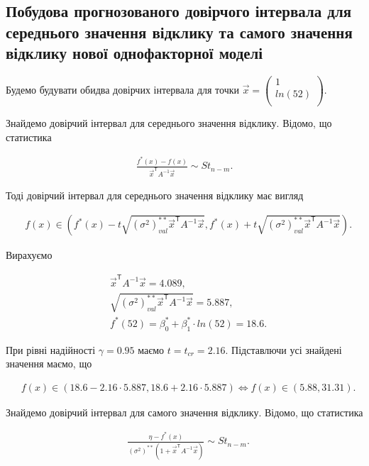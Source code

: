 \documentclass[14pt,a4paper]{scrartcl}
\theoremstyle{definition}
\theoremstyle{remark}
\theoremstyle{definition}
\theoremstyle{definition}
\begin{document}
\subsection{Побудова прогнозованого довірчого інтервала для середнього значення відклику та самого значення відклику нової однофакторної моделі}

Будемо будувати обидва довірчих інтервала для точки $\vec{x} = \begin{pmatrix}
  1 \\
  ln(52) \\
\end{pmatrix}$.

Знайдемо довірчий інтервал для середнього значення відклику. Відомо, що статистика

\begin{align*}
  \frac{f^{*}(x) - f(x)}{\vec{x}^\mathsf{T}A^{-1}\vec{x}} \sim St_{n - m}.
\end{align*}

Тоді довірчий інтервал для середнього значення відклику має вигляд

\begin{align*}
  & f(x) \in \left( f^{*}(x) - t \sqrt{(\sigma^2)^{**}_{val}  \vec{x}^\mathsf{T} A^{-1} \vec{x}}, f^{*}(x) + t \sqrt{(\sigma^2)^{**}_{val} \vec{x}^\mathsf{T} A^{-1} \vec{x}}  \right).
\end{align*}

Вирахуємо

\begin{align*}
  & \vec{x}^\mathsf{T}A^{-1}\vec{x} = 4.089, \\
  & \sqrt{(\sigma^2)^{**}_{val} \vec{x}^\mathsf{T} A^{-1} \vec{x}} = 5.887, \\
  & f^{*}(52) = \beta^{*}_{0} +  \beta^{*}_{1} \cdot ln(52) = 18.6.
\end{align*}

При рівні надійності $\gamma = 0.95$ маємо $t = t_{cr} = 2.16$. Підставлючи усі знайдені значення маємо, що

\begin{align*}
  & f(x) \in \left( 18.6 - 2.16 \cdot 5.887, 18.6 + 2.16 \cdot 5.887  \right) \Leftrightarrow f(x) \in \left( 5.88, 31.31 \right).
\end{align*}

Знайдемо довірчий інтервал для самого значення відклику. Відомо, що статистика

\begin{align*}
  & \frac{\eta - f^{*}(x)}{(\sigma^2)^{**} (1 + \vec{x}^\mathsf{T} A^{-1} \vec{x})} \sim St_{n - m}.
\end{align*}
\end{document}
